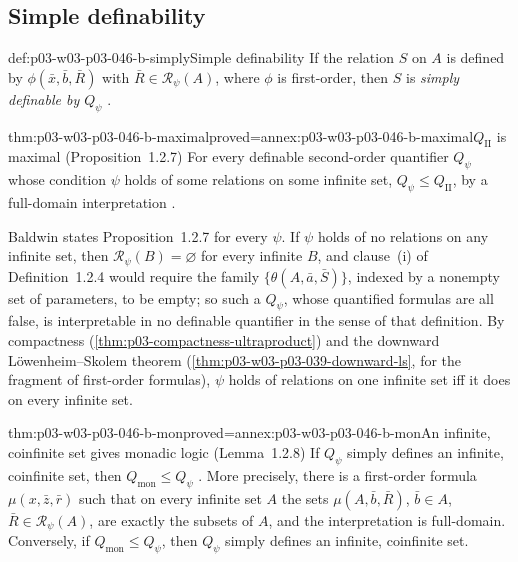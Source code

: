 \subsection{Simple definability}
\label{sec:p03-w03-p03-046-b-simple}

\begin{hbdefinition}{def:p03-w03-p03-046-b-simply}{Simple definability}
If the relation \(S\) on \(A\) is defined by \(\phi(\bar x,\bar b,\bar R)\)
with \(\bar R\in\mathscr R_\psi(A)\), where \(\phi\) is first-order, then
\(S\) is \emph{simply definable by \(Q_\psi\)}
\cite[p.~449, Definition~1.2.6]{Baldwin1985DSOQ}.
\end{hbdefinition}

\begin{hblemma}{thm:p03-w03-p03-046-b-maximal}{proved=annex:p03-w03-p03-046-b-maximal}{\(Q_{\mathrm{II}}\) is maximal (Proposition~1.2.7)}
For every definable second-order quantifier \(Q_\psi\) whose condition
\(\psi\) holds of some relations on some infinite set,
\(Q_\psi\le Q_{\mathrm{II}}\), by a full-domain interpretation
\cite[p.~449, Proposition~1.2.7]{Baldwin1985DSOQ}.
\end{hblemma}

Baldwin states Proposition~1.2.7 for every \(\psi\). If \(\psi\) holds of no
relations on any infinite set, then \(\mathscr R_\psi(B)=\varnothing\) for
every infinite \(B\), and clause~(i) of Definition~1.2.4 would require
the family \(\{\theta(A,\bar a,\bar S)\}\), indexed by a nonempty set of
parameters, to be empty; so such a \(Q_\psi\), whose quantified formulas
are all false, is interpretable in no definable quantifier in the sense of
that definition. By compactness (\cref{thm:p03-compactness-ultraproduct}) and the
downward L\"owenheim--Skolem theorem
(\cref{thm:p03-w03-p03-039-downward-ls}, for the fragment of first-order
formulas), \(\psi\) holds of relations on one infinite set iff it does on
every infinite set.

\begin{hblemma}{thm:p03-w03-p03-046-b-mon}{proved=annex:p03-w03-p03-046-b-mon}{An infinite, coinfinite set gives monadic logic (Lemma~1.2.8)}
If \(Q_\psi\) simply defines an infinite, coinfinite set, then
\(Q_{\mathrm{mon}}\le Q_\psi\) \cite[p.~449, Lemma~1.2.8]{Baldwin1985DSOQ}.
More precisely, there is a first-order formula \(\mu(x,\bar z,\bar r)\)
such that on every infinite set \(A\) the sets \(\mu(A,\bar b,\bar R)\),
\(\bar b\in A\), \(\bar R\in\mathscr R_\psi(A)\), are exactly the subsets
of \(A\), and the interpretation is full-domain. Conversely, if
\(Q_{\mathrm{mon}}\le Q_\psi\), then \(Q_\psi\) simply defines an infinite,
coinfinite set.
\end{hblemma}

